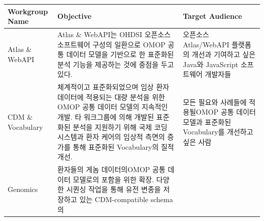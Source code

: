 \documentclass[11pt]{book}
\theoremstyle{definition}
\theoremstyle{definition}
\theoremstyle{definition}
\theoremstyle{remark}
\begin{document}
\begin{longtable}[]{@{}lll@{}}
\toprule
\begin{minipage}[b]{0.11\columnwidth}\raggedright\strut
Workgroup Name\strut
\end{minipage} & \begin{minipage}[b]{0.30\columnwidth}\raggedright\strut
Objective\strut
\end{minipage} & \begin{minipage}[b]{0.15\columnwidth}\raggedright\strut
Target Audience\strut
\end{minipage}\tabularnewline
\midrule
\endhead
\begin{minipage}[t]{0.11\columnwidth}\raggedright\strut
Atlas \& WebAPI\strut
\end{minipage} & \begin{minipage}[t]{0.30\columnwidth}\raggedright\strut
Atlas \& WebAPI는 OHDSI 오픈소스 소프트웨어 구성의 일환으로 OMOP 공통
데이터 모델을 기반으로 한 표준화된 분석 기능을 제공하는 것에 중점을 두고
있다.\strut
\end{minipage} & \begin{minipage}[t]{0.15\columnwidth}\raggedright\strut
오픈소스 Atlas/WebAPI 플랫폼의 개선과 기여하고 싶은 Java와 JavaScript
소프트웨어 개발자들\strut
\end{minipage}\tabularnewline
\begin{minipage}[t]{0.11\columnwidth}\raggedright\strut
CDM \& Vocabulary\strut
\end{minipage} & \begin{minipage}[t]{0.30\columnwidth}\raggedright\strut
체계적이고 표준화되었으며 임상 환자 데이터에 적용되는 대량 분석을 위한
OMOP 공통 데이터 모델의 지속적인 개발. 타 워크그룹에 의해 개발된
표준화된 분석을 지원하기 위해 국제 코딩 시스템과 환자 케어의 임상적
측면의 증가를 통해 표준화된 Vocabulary의 질적 개선.\strut
\end{minipage} & \begin{minipage}[t]{0.15\columnwidth}\raggedright\strut
모든 필요와 사례들에 적용될OMOP 공통 데이터 모델과 표준화된 Vocabulary를
개선하고 싶은 사람\strut
\end{minipage}\tabularnewline
\begin{minipage}[t]{0.11\columnwidth}\raggedright\strut
Genomics\strut
\end{minipage} & \begin{minipage}[t]{0.30\columnwidth}\raggedright\strut
환자들의 게놈 데이터의OMOP 공통 데이터 모델로의 포함을 위한 확장. 다양한
시퀀싱 작업을 통해 유전 변종을 저장하고 있는 CDM-compatible schema의

\end{minipage}
\end{longtable}
\end{document}
